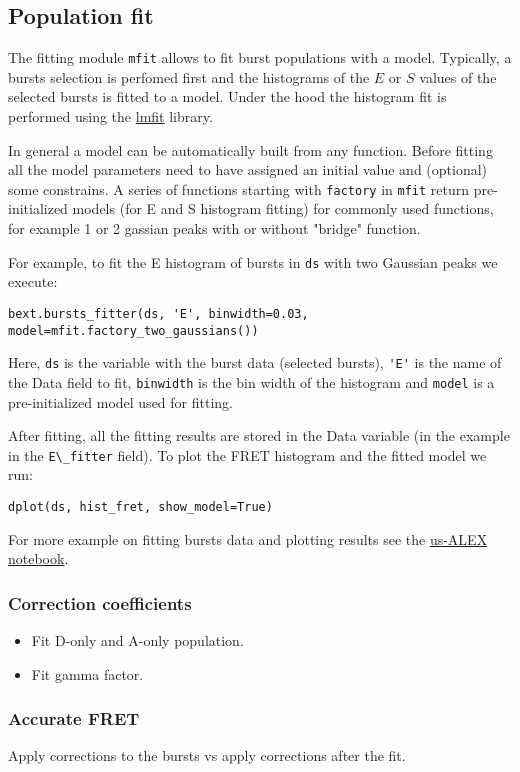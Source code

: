 
\subsection{Population fit}

The fitting module \verb|mfit| allows to fit burst populations with a model. Typically, a bursts selection is perfomed first and the histograms of the $E$ or $S$ values of the selected bursts is fitted to a model. Under the hood the
histogram fit is performed using the \href{http://lmfit.github.io/lmfit-py/}{lmfit} library.

In general a model can be automatically built from any function. Before fitting all the model parameters need to have assigned an initial value and (optional) some constrains. A series of functions starting with \verb|factory| in \verb|mfit| return pre-initialized models (for E and S histogram fitting) for commonly used functions, for example 1 or 2 gassian peaks with or without "bridge" function.

For example, to fit the E histogram of bursts in \verb|ds| with two Gaussian peaks we execute:

\begin{verbatim}
bext.bursts_fitter(ds, 'E', binwidth=0.03, model=mfit.factory_two_gaussians())
\end{verbatim}

Here, \verb|ds| is the variable with the burst data (selected bursts), \verb|'E'| is the name of the Data field to fit, \verb|binwidth| is the bin width of the histogram and \verb|model| is a pre-initialized model used for fitting.

After fitting, all the fitting results are stored in the Data variable (in the example in the \verb|E\_fitter| field).
To plot the FRET histogram and the fitted model we run:

\begin{verbatim}
dplot(ds, hist_fret, show_model=True)
\end{verbatim}
For more example on fitting bursts data and plotting results see the \href{http://nbviewer.ipython.org/urls/raw.github.com/tritemio/FRETBursts_notebooks/master/notebooks/FRETBursts%2520-%2520us-ALEX%2520smFRET%2520burst%2520analysis.ipynb}{us-ALEX notebook}.


\subsubsection{Correction coefficients}


\begin{itemize}
\item Fit D-only and A-only population.
\item Fit gamma factor.
\end{itemize}


\subsubsection{Accurate FRET}

Apply corrections to the bursts vs apply corrections after the fit.

